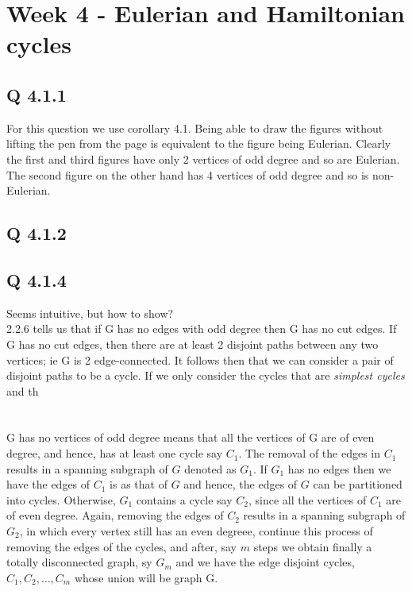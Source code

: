 

\chapter[Week 4 - Eulerian and Hamiltonian cycles]{Week 4 - Eulerian and Hamiltonian cycles}

\section{Q 4.1.1}
For this question we use corollary 4.1. Being able to draw the figures without lifting the pen from the page is equivalent to the figure being Eulerian. Clearly the first and third figures have only 2 vertices of odd degree and so are Eulerian. The second figure on the other hand has 4 vertices of odd degree and so is non-Eulerian.

\section{Q 4.1.2}


\section{Q 4.1.4}
Seems intuitive, but how to show?\\
2.2.6 tells us that if G has no edges with odd degree then G has no cut edges. If G has no cut edges, then there are at least 2 disjoint paths between any two vertices; ie G is 2 edge-connected. It follows then that we can consider a pair of disjoint paths to be a cycle. If we only consider the cycles that are \emph{simplest cycles} and th\\
\\
\\
G has no vertices of odd degree means that all the vertices of G are of even degree, and hence, has at least one cycle say $C_1$. The removal of the edges in $C_1$ results in a spanning subgraph of $G$ denoted as $G_1$. If $G_1$ has no edges then we have the edges of $C_1$ is as that of $G$ and hence, the edges of $G$ can be partitioned into cycles. Otherwise, $G_1$ contains a cycle say $C_2$, since all the vertices of $C_1$ are of even degree. Again, removing the edges of $C_2$ results in a spanning subgraph of $G_2$, in which every vertex still has an even degreee, continue this process of removing the edges of the cycles, and after, say $m$ steps we obtain finally a totally disconnected graph, sy $G_m$ and we have the edge disjoint cycles, $C_1,C_2,\dots,C_m$ whose union will be graph G.\\

